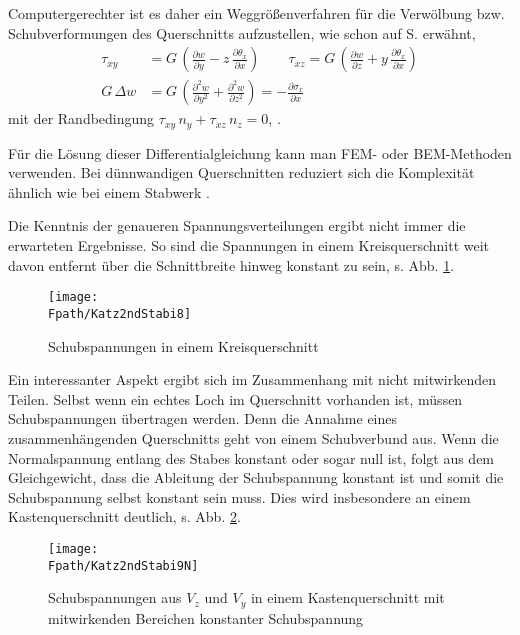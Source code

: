 Computergerechter ist es daher ein Weggr\"{o}{\ss}enverfahren f\"{u}r die Verw\"{o}lbung bzw. Schubverformungen des Querschnitts aufzustellen, wie schon auf S. \pageref{U501} erw\"{a}hnt,
\begin{align}
\tau_{xy} &= G\,(\frac{\partial w}{\partial y} - z\,\frac{\partial \theta_x}{\partial x})
 \qquad
\tau_{xz} = G\,(\frac{\partial w}{\partial z} + y\,\frac{\partial \theta_x}{\partial x}) \\
G\,\Delta w &= G\,(\frac{\partial^2 w}{\partial y^2} + \frac{\partial^2 w}{\partial z^2}) = - \frac{\partial \sigma_x}{\partial x}
\end{align}
mit der Randbedingung $\tau_{xy}\,n_y + \tau_{xz}\,n_z = 0$, \cite{Kraus}.

F\"{u}r die L\"{o}sung dieser Differentialgleichung kann man FEM- oder BEM-Methoden verwenden. Bei d\"{u}nnwandigen Querschnitten reduziert sich die Komplexit\"{a}t \"{a}hnlich wie bei einem Stabwerk \cite{Schade}.

Die Kenntnis der genaueren Spannungsverteilungen ergibt nicht immer die erwarteten Ergebnisse. So sind die Spannungen in einem Kreisquerschnitt weit davon entfernt \"{u}ber die Schnittbreite hinweg konstant zu sein, s. Abb. \ref{Katz2ndStabi8}.
\begin{figure}[tbp] \centering
\centering
\if {} \sidecaption[t] \fi
\texttt{[image: \\Fpath/Katz2ndStabi8]}
\caption{Schubspannungen in einem Kreisquerschnitt} \label{Katz2ndStabi8}
\end{figure}%

Ein interessanter Aspekt ergibt sich im Zusammenhang mit nicht mitwirkenden Teilen. Selbst wenn ein echtes Loch im Querschnitt vorhanden ist, m\"{u}ssen Schubspannungen \"{u}bertragen werden. Denn die Annahme eines zusammenh\"{a}ngenden Querschnitts geht von einem Schubverbund aus. Wenn die Normalspannung entlang des Stabes konstant oder sogar null ist, folgt aus dem Gleichgewicht, dass die Ableitung der Schubspannung konstant ist und somit die Schubspannung selbst konstant sein muss. Dies wird insbesondere an einem Kastenquerschnitt deutlich, s. Abb. \ref{Katz2ndStabi9}.

\begin{figure}[tbp] \centering
\centering
\if {} \sidecaption[t] \fi
\texttt{[image: \\Fpath/Katz2ndStabi9N]}
\caption{ Schubspannungen aus $V_z$ und $V_y$ in einem Kastenquerschnitt mit mitwirkenden Bereichen konstanter Schubspannung} \label{Katz2ndStabi9}
\end{figure}%

